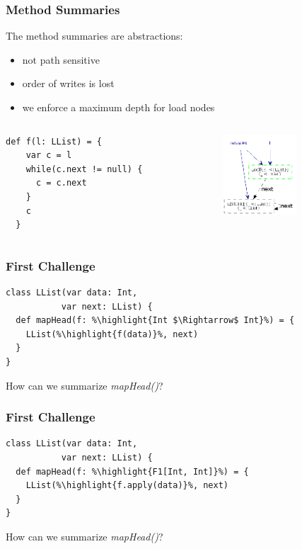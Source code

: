 \documentclass[hyperref={pdfpagelabels=false}]{beamer}
\newcommand\highlight[1]{\color{red}{#1}}
\begin{document}
\begin{frame}[fragile]
\frametitle{Method Summaries}
    The method summaries are abstractions:
    \begin{itemize}
        \item not path sensitive
        \item order of writes is lost
        \item we enforce a maximum depth for load nodes
    \end{itemize}
  \begin{columns}
    \begin{column}{0.4\textwidth}
\begin{lstlisting}[escapechar=\%]
  def f(l: LList) = {
    var c = l
    while(c.next != null) {
      c = c.next
    }
    c
  }
\end{lstlisting}
    \end{column}
    \begin{column}{0.6\textwidth}
      \begin{figure}[t]
        \includegraphics[height=30mm]{images/e6.png}\\
      \end{figure}
    \end{column}
  \end{columns}
\end{frame}

\begin{frame}[fragile]
\frametitle{First Challenge}
\begin{lstlisting}[escapechar=\%]
class LList(var data: Int,
           var next: LList) {
  def mapHead(f: %\highlight{Int $\Rightarrow$ Int}%) = {
    LList(%\highlight{f(data)}%, next)
  }
}
\end{lstlisting}

    \vspace{10pt}
    How can we summarize \emph{mapHead()}?
\end{frame}

\begin{frame}[fragile]
\frametitle{First Challenge}
\begin{lstlisting}[escapechar=\%]
class LList(var data: Int,
           var next: LList) {
  def mapHead(f: %\highlight{F1[Int, Int]}%) = {
    LList(%\highlight{f.apply(data)}%, next)
  }
}
\end{lstlisting}

    \vspace{10pt}
    How can we summarize \emph{mapHead()}?
\end{frame}
\end{document}
